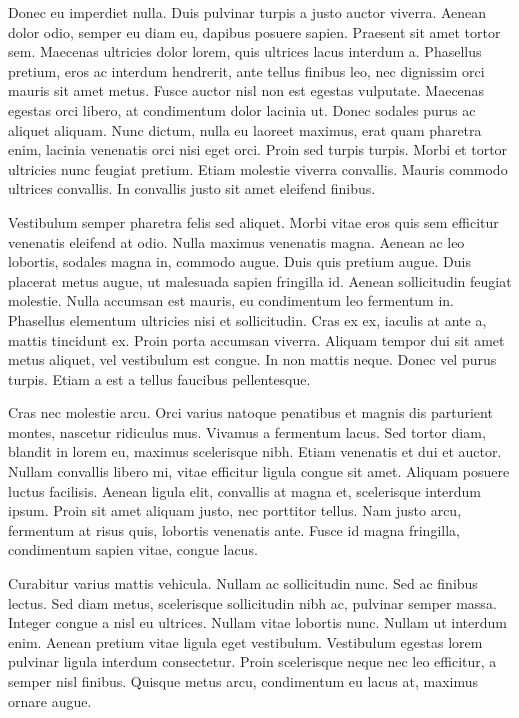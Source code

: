 Donec eu imperdiet nulla. Duis pulvinar turpis a justo auctor viverra. Aenean
dolor odio, semper eu diam eu, dapibus posuere sapien. Praesent sit amet tortor
sem. Maecenas ultricies dolor lorem, quis ultrices lacus interdum a. Phasellus
pretium, eros ac interdum hendrerit, ante tellus finibus leo, nec dignissim
orci mauris sit amet metus. Fusce auctor nisl non est egestas vulputate.
Maecenas egestas orci libero, at condimentum dolor lacinia ut. Donec sodales
purus ac aliquet aliquam. Nunc dictum, nulla eu laoreet maximus, erat quam
pharetra enim, lacinia venenatis orci nisi eget orci. Proin sed turpis turpis.
Morbi et tortor ultricies nunc feugiat pretium. Etiam molestie viverra
convallis. Mauris commodo ultrices convallis. In convallis justo sit amet
eleifend finibus.

Vestibulum semper pharetra felis sed aliquet. Morbi vitae eros quis sem
efficitur venenatis eleifend at odio. Nulla maximus venenatis magna. Aenean ac
leo lobortis, sodales magna in, commodo augue. Duis quis pretium augue. Duis
placerat metus augue, ut malesuada sapien fringilla id. Aenean sollicitudin
feugiat molestie. Nulla accumsan est mauris, eu condimentum leo fermentum in.
Phasellus elementum ultricies nisi et sollicitudin. Cras ex ex, iaculis at ante
a, mattis tincidunt ex. Proin porta accumsan viverra. Aliquam tempor dui sit
amet metus aliquet, vel vestibulum est congue. In non mattis neque. Donec vel
purus turpis. Etiam a est a tellus faucibus pellentesque.

Cras nec molestie arcu. Orci varius natoque penatibus et magnis dis parturient
montes, nascetur ridiculus mus. Vivamus a fermentum lacus. Sed tortor diam,
blandit in lorem eu, maximus scelerisque nibh. Etiam venenatis et dui et
auctor. Nullam convallis libero mi, vitae efficitur ligula congue sit amet.
Aliquam posuere luctus facilisis. Aenean ligula elit, convallis at magna et,
scelerisque interdum ipsum. Proin sit amet aliquam justo, nec porttitor tellus.
Nam justo arcu, fermentum at risus quis, lobortis venenatis ante. Fusce id
magna fringilla, condimentum sapien vitae, congue lacus.

Curabitur varius mattis vehicula. Nullam ac sollicitudin nunc. Sed ac finibus
lectus. Sed diam metus, scelerisque sollicitudin nibh ac, pulvinar semper
massa. Integer congue a nisl eu ultrices. Nullam vitae lobortis nunc. Nullam ut
interdum enim. Aenean pretium vitae ligula eget vestibulum. Vestibulum egestas
lorem pulvinar ligula interdum consectetur. Proin scelerisque neque nec leo
efficitur, a semper nisl finibus. Quisque metus arcu, condimentum eu lacus at,
maximus ornare augue.

